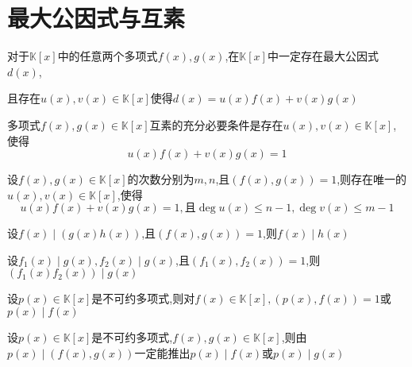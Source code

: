 \section{最大公因式与互素}

\begin{knowledge}[线性表示最小公因式]
    对于$\mathbb{K}[x]$中的任意两个多项式$f(x),g(x)$,在$\mathbb{K}[x]$中一定存在最大公因式$d(x)$,

    且存在$u(x),v(x)\in \mathbb{K}[x]$使得$d(x)=u(x)f(x)+v(x)g(x)$
\end{knowledge}

\begin{knowledge}[互素的充要条件]
    多项式$f(x),g(x)\in \mathbb{K}[x]$互素的充分必要条件是存在$u(x),v(x)\in \mathbb{K}[x]$,使得
    \begin{equation}
        u(x)f(x)+v(x)g(x)=1
    \end{equation}
\end{knowledge}

\begin{knowledge}\label{裴蜀定理}
    设$f(x),g(x)\in \mathbb{K}[x]$的次数分别为$m,n$,且$(f(x),g(x))=1$,则存在唯一的$u(x),v(x)\in \mathbb{K}[x]$,使得
    \begin{equation*}
        u(x)f(x)+v(x)g(x)=1,\mbox{且}\deg u(x)\le n-1,\deg v(x)\le m-1
    \end{equation*}
\end{knowledge}

\begin{knowledge}[互素与整除1]
    设$f(x)\mid (g(x)h(x))$,且$(f(x),g(x))=1$,则$f(x)\mid h(x)$
\end{knowledge}

\begin{knowledge}[互素与整除2]\label{知识点1.2.5}
    设$f_1(x)\mid g(x),f_2(x)\mid g(x)$,且$(f_1(x),f_2(x))=1$,则$(f_1(x)f_2(x))\mid g(x)$
\end{knowledge}

\begin{knowledge}[不可约多项式与整除1]
    设$p(x)\in \mathbb{K}[x]$是不可约多项式,则对$f(x)\in \mathbb{K}[x],(p(x),f(x))=1$或$p(x)\mid f(x)$
\end{knowledge}

\begin{knowledge}[不可约多项式与整除2]
    设$p(x)\in \mathbb{K}[x]$是不可约多项式,$f(x),g(x)\in \mathbb{K}[x]$,则由$p(x)\mid (f(x),g(x))$一定能推出$p(x)\mid f(x)$或$p(x)\mid g(x)$
\end{knowledge}

